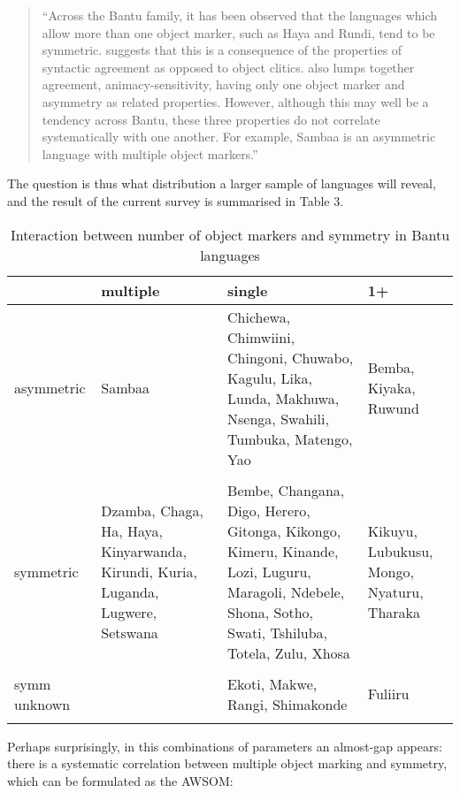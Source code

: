 \documentclass[output=paper
,modfonts
,nonflat]{langsci/langscibook}
\begin{document}
\begin{quote}
	“Across the Bantu family, it has been observed that the languages which allow more than one object marker, such as Haya and Rundi, tend to be symmetric. \citet{Baker2008a} suggests that this is a consequence of the properties of syntactic agreement as opposed to object clitics. \citet{Bentley1994} also lumps together agreement, animacy-sensitivity, having only one object marker and asymmetry as related properties. However, although this may well be a tendency across Bantu, these three properties do not correlate systematically with one another. For example, Sambaa is an asymmetric language with multiple object markers.” \citep[78]{Riedel2009}
\end{quote}
The question is thus what distribution a larger sample of languages will reveal, and the result of the current survey is summarised in Table 3.
\begin{table}
\caption{Interaction between number of object markers and symmetry in Bantu languages} 
\label{Table 3}
\begin{tabularx}{\textwidth}{XXXX}
	\lsptoprule
	& multiple & single & 1+\\
	\midrule
	asymmetric & Sambaa & Chichewa, Chimwiini, Chingoni, Chuwabo, Kagulu, Lika, Lunda, Makhuwa, Nsenga, Swahili, Tumbuka, Matengo, Yao & Bemba, Kiyaka, Ruwund\\ \\
	\midrule
	symmetric & Dzamba, Chaga, Ha, Haya, Kinyarwanda, Kirundi, Kuria, Luganda, Lugwere, Setswana & Bembe, Changana, Digo, Herero, Gitonga, Kikongo, Kimeru, Kinande, Lozi, Luguru, Maragoli, Ndebele, Shona, Sotho, Swati, Tshiluba, Totela, Zulu, Xhosa & Kikuyu, Lubukusu, Mongo, Nyaturu, Tharaka\\ \\
	\midrule
	symm unknown &  & Ekoti, Makwe, Rangi, Shimakonde & Fuliiru\\
	\lspbottomrule
\end{tabularx}
\end{table} \newpage \noindent
Perhaps surprisingly, in this combinations of parameters an almost-gap appears: there is a systematic correlation between multiple object marking and symmetry, which can be formulated as the AWSOM:
\end{document}
